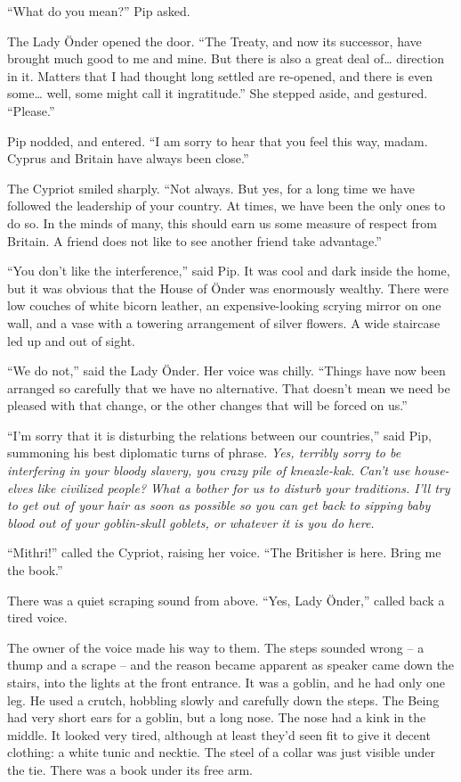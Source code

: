 ``What do you mean?'' Pip asked.

The Lady Önder opened the door. ``The Treaty, and now its successor,
have brought much good to me and mine. But there is also a great deal
of\ldots{} direction in it. Matters that I had thought long settled are
re-opened, and there is even some\ldots{} well, some might call it
ingratitude.'' She stepped aside, and gestured. ``Please.''

Pip nodded, and entered. ``I am sorry to hear that you feel this way,
madam. Cyprus and Britain have always been close.''

The Cypriot smiled sharply. ``Not always. But yes, for a long time we
have followed the leadership of your country. At times, we have been the
only ones to do so. In the minds of many, this should earn us some
measure of respect from Britain. A friend does not like to see another
friend take advantage.''

``You don't like the interference,'' said Pip. It was cool and dark
inside the home, but it was obvious that the House of Önder was
enormously wealthy. There were low couches of white bicorn leather, an
expensive-looking scrying mirror on one wall, and a vase with a towering
arrangement of silver flowers. A wide staircase led up and out of sight.

``We do not,'' said the Lady Önder. Her voice was chilly. ``Things have
now been arranged so carefully that we have no alternative. That doesn't
mean we need be pleased with that change, or the other changes that will
be forced on us.''

``I'm sorry that it is disturbing the relations between our countries,''
said Pip, summoning his best diplomatic turns of phrase. \emph{Yes,
terribly sorry to be interfering in your bloody slavery, you crazy pile
of kneazle-kak. Can't use house-elves like civilized people? What a
bother for us to disturb your traditions. I'll try to get out of your
hair as soon as possible so you can get back to sipping baby blood out
of your goblin-skull goblets, or whatever it is you do here.}

``Mithri!'' called the Cypriot, raising her voice. ``The Britisher is
here. Bring me the book.''

There was a quiet scraping sound from above. ``Yes, Lady Önder,'' called
back a tired voice.

The owner of the voice made his way to them. The steps sounded wrong --
a thump and a scrape -- and the reason became apparent as speaker came
down the stairs, into the lights at the front entrance. It was a goblin,
and he had only one leg. He used a crutch, hobbling slowly and carefully
down the steps. The Being had very short ears for a goblin, but a long
nose. The nose had a kink in the middle. It looked very tired, although
at least they'd seen fit to give it decent clothing: a white tunic and
necktie. The steel of a collar was just visible under the tie. There was
a book under its free arm.


